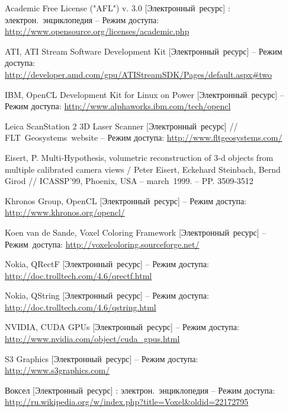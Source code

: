 \renewcommand{\refname}{Список литературы}
\begin{thebibliography}{99}

		Academic Free License ("AFL") v. 3.0 [Электронный~ресурс] : электрон.~энциклопедия -- Режим доступа:
		\url{http://www.opensource.org/licenses/academic.php}

		ATI, ATI Stream Software Development Kit [Электронный~ресурс]
		 -- Режим доступа:
		\url{http://developer.amd.com/gpu/ATIStreamSDK/Pages/default.aspx#two}

		IBM, OpenCL Development Kit for Linux on Power [Электронный~ресурс]
		-- Режим доступа:
		\url{http://www.alphaworks.ibm.com/tech/opencl}

		Leica ScanStation 2 3D Laser Scanner [Электронный~ресурс] //
		FLT~Geosystems~website -- Режим доступа:
		\url{http://www.fltgeosystems.com/}

		Eisert, P. Multi-Hypothesis, volumetric reconstruction of 3-d objects from multiple calibrated camera views /
		Peter Eisert, Eckehard Steinbach, Bernd Girod //
		ICASSP’99, Phoenix, USA -- march~1999. -- PP. 3509-3512

		Khronos Group, OpenCL [Электронный~ресурс] -- Режим доступа:
		\url{http://www.khronos.org/opencl/}

		Koen van de Sande, Voxel Coloring Framework [Электронный~ресурс]
		-- Режим~доступа:
		\url{http://voxelcoloring.sourceforge.net/}

		Nokia, QRectF [Электронный~ресурс]
		-- Режим доступа:
		\url{http://doc.trolltech.com/4.6/qrectf.html}

		Nokia, QString [Электронный~ресурс]
		-- Режим доступа:
		\url{http://doc.trolltech.com/4.6/qstring.html}

		NVIDIA, CUDA GPUs [Электронный~ресурс] -- Режим доступа:\\
		\url{http://www.nvidia.com/object/cuda_gpus.html}

		S3 Graphics [Электронный~ресурс] -- Режим доступа:
		\url{http://www.s3graphics.com/}

		Воксел [Электронный~ресурс] : электрон.~энциклопедия -- Режим доступа: \url{http://ru.wikipedia.org/w/index.php?title=Voxel&oldid=22172795}
	

\end{thebibliography}
